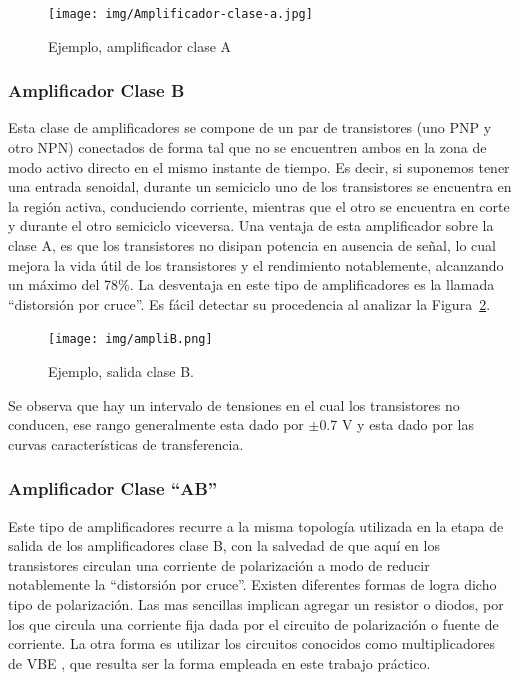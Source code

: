 \documentclass[a4paper,12pt,twoside]{article}
\begin{document}
\begin{figure}[H]
\centering
\texttt{[image: img/Amplificador-clase-a.jpg]}
\caption{Ejemplo, amplificador clase A}
\label{ampliA} 
\end{figure}

\medskip 
\subsubsection*{Amplificador Clase B}

Esta clase de amplificadores se compone de un par de transistores (uno PNP y otro NPN) conectados de forma tal que no se encuentren ambos en la zona de modo activo directo en el mismo instante de tiempo. Es decir, si suponemos tener una entrada senoidal, durante un semiciclo uno de los transistores se encuentra en la región activa, conduciendo corriente, mientras que el otro se encuentra en corte y durante el otro semiciclo viceversa.
 Una ventaja de esta amplificador sobre la clase A, es que los transistores no disipan potencia en ausencia de señal, lo cual mejora la vida útil de los transistores y el rendimiento notablemente, alcanzando un máximo del 78\%.
 La desventaja en este tipo de amplificadores es la llamada “distorsión por cruce”. Es fácil detectar su procedencia al analizar la Figura~\ref{ampliB}.

\begin{figure}[H]
\centering
\texttt{[image: img/ampliB.png]}
\caption{Ejemplo, salida clase B.}
\label{ampliB} 
\end{figure}


Se observa que hay un intervalo de tensiones en el cual los transistores no conducen, ese rango generalmente esta dado por $\pm$0.7 V y esta dado por las curvas características de transferencia.

\medskip 
\subsubsection*{Amplificador Clase “AB”}


 Este tipo de amplificadores recurre a la misma topología utilizada en la etapa de salida de los amplificadores clase B, con la salvedad de que aquí en los transistores circulan una corriente de polarización a modo de reducir notablemente la “distorsión por cruce”.
 Existen diferentes formas de logra dicho tipo de polarización. Las mas sencillas implican agregar un resistor o diodos, por los que circula una corriente fija dada por el circuito de polarización o fuente de corriente. La otra forma es utilizar los circuitos conocidos como multiplicadores de VBE , que resulta ser la forma empleada en este trabajo práctico.
\end{document}
